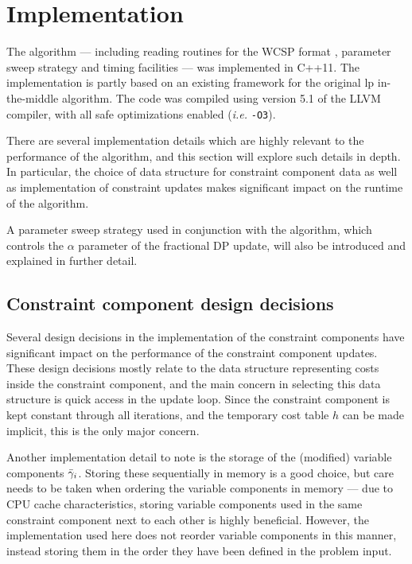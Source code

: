 \section{Implementation}
The algorithm --- including reading routines for the WCSP format \parencite{wcspformat}, parameter sweep strategy and timing facilities --- was implemented in C++11.
The implementation is partly based on an existing framework for the original \gls{lp} in-the-middle algorithm.
The code was compiled using version 5.1 of the LLVM compiler, with all safe optimizations enabled (\emph{i.e.} \texttt{-O3}).

There are several implementation details which are highly relevant to the performance of the algorithm, and this section will explore such details in depth.
In particular, the choice of data structure for constraint component data as well as implementation of constraint updates makes significant impact on the runtime of the algorithm.

A parameter sweep strategy used in conjunction with the algorithm, which controls the \(\alpha\) parameter of the fractional DP update, will also be introduced and explained in further detail.

\subsection{Constraint component design decisions}
Several design decisions in the implementation of the constraint components have significant impact on the performance of the constraint component updates.
These design decisions mostly relate to the data structure representing costs inside the constraint component, and the main concern in selecting this data structure is quick access in the update loop.
Since the constraint component is kept constant through all iterations, and the temporary cost table \(h\) can be made implicit, this is the only major concern.

Another implementation detail to note is the storage of the (modified) variable components \(\bar{\gamma}_i\).
Storing these sequentially in memory is a good choice, but care needs to be taken when ordering the variable components in memory --- due to CPU cache characteristics, storing variable components used in the same constraint component next to each other is highly beneficial.
However, the implementation used here does not reorder variable components in this manner, instead storing them in the order they have been defined in the problem input.

